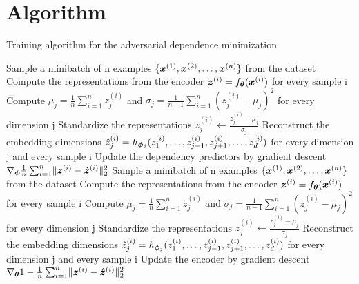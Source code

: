 \section{Algorithm} \label{app:algo}

\begin{algorithm}
\caption{Training algorithm for the adversarial dependence minimization}
\label{alg:adversarialgame}
\begin{algorithmic}[1]
        \State Sample a minibatch of n examples $\{{\bm{x}}^{(1)}, {\bm{x}}^{(2)}, \dots, {\bm{x}}^{(n)}\}$ from the dataset
        \State Compute the representations from the encoder ${\bm{z}}^{(i)} = f_{{\bm{\theta}}}({\bm{x}}^{(i)})$ for every sample i
        \State Compute $\mu_{j} = \frac{1}{n} \sum_{i=1}^n z^{(i)}_j$ and $\sigma_{j} = \frac{1}{n-1} \sum_{i=1}^n (z^{(i)}_j - \mu_{j})^2$ for every dimension j
        \State Standardize the representations $z^{(i)}_{j} \gets \frac{z^{(i)}_{j} - \mu_{j}}{\sigma_{j}}$
        \State Reconstruct the embedding dimensions $\hat{z}^{(i)}_j = h_{{\bm{\phi}}_j}(z^{(i)}_1, \dots, z^{(i)}_{j-1}, z^{(i)}_{j+1}, \dots, z^{(i)}_{d})$ for every dimension j and every sample i
        \State Update the dependency predictors by gradient descent $\nabla_{{\bm{\phi}}} \frac{1}{n} \sum_{i=1}^n \lVert {\bm{z}}^{(i)} - \hat{{\bm{z}}}^{(i)} \rVert_2^2$
    \EndFor
    \State Sample a minibatch of n examples $\{{\bm{x}}^{(1)}, {\bm{x}}^{(2)}, \dots, {\bm{x}}^{(n)}\}$ from the dataset
    \State Compute the representations from the encoder ${\bm{z}}^{(i)} = f_{{\bm{\theta}}}({\bm{x}}^{(i)})$ for every sample i
    \State Compute $\mu_{j} = \frac{1}{n} \sum_{i=1}^n z^{(i)}_j$ and $\sigma_{j} = \frac{1}{n-1} \sum_{i=1}^n (z^{(i)}_j - \mu_{j})^2$ for every dimension j
    \State Standardize the representations $z^{(i)}_{j} \gets \frac{z^{(i)}_{j} - \mu_{j}}{\sigma_{j}}$
    \State Reconstruct the embedding dimensions $\hat{z}^{(i)}_j = h_{{\bm{\phi}}_j}(z^{(i)}_1, \dots, z^{(i)}_{j-1}, z^{(i)}_{j+1}, \dots, z^{(i)}_{d})$ for every dimension j and every sample i
    \State Update the encoder by gradient descent $\nabla_{{\bm{\theta}}} 1 - \frac{1}{n} \sum_{i=1}^n \lVert {\bm{z}}^{(i)} - \hat{{\bm{z}}}^{(i)} \rVert_2^2$
\EndFor
\end{algorithmic}
\end{algorithm}

